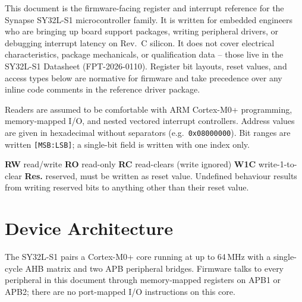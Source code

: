 \documentclass[11pt,a4paper,parskip=half]{scrartcl}
\begin{document}
This document is the firmware-facing register and interrupt reference for the
Synapse SY32L-S1 microcontroller family. It is written for embedded engineers
who are bringing up board support packages, writing peripheral drivers, or
debugging interrupt latency on Rev.\ C silicon. It does not cover electrical
characteristics, package mechanicals, or qualification data -- those live in
the SY32L-S1 Datasheet (FPT-2026-0110). Register bit layouts, reset values,
and access types below are normative for firmware and take precedence over
any inline code comments in the reference driver package.

Readers are assumed to be comfortable with ARM Cortex-M0+ programming,
memory-mapped I/O, and nested vectored interrupt controllers. Address values
are given in hexadecimal without separators (e.g.\ \texttt{0x08000000}).
Bit ranges are written \texttt{[MSB:LSB]}; a single-bit field is written with
one index only.

\begin{noticebox}[title={\faInfoCircle\ Register Notation}]
\small
\textbf{RW} read/write \quad
\textbf{RO} read-only \quad
\textbf{RC} read-clears (write ignored) \quad
\textbf{W1C} write-1-to-clear \quad
\textbf{Res.} reserved, must be written as reset value.
Undefined behaviour results from writing reserved bits to anything other
than their reset value.
\end{noticebox}

\section{Device Architecture}

The SY32L-S1 pairs a Cortex-M0+ core running at up to 64\,MHz with a
single-cycle AHB matrix and two APB peripheral bridges. Firmware talks to
every peripheral in this document through memory-mapped registers on APB1
or APB2; there are no port-mapped I/O instructions on this core.
\end{document}

